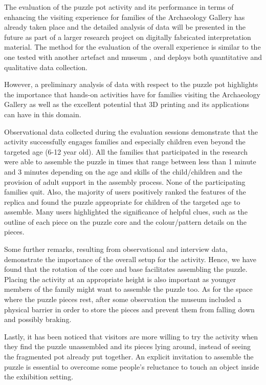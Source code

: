 \documentclass[acmlarge,screen,dvipsnames]{acmart}
\begin{document}
\greenBegin
The evaluation of the puzzle pot activity 
and its performance in terms of enhancing the visiting experience for families 
of the Archaeology Gallery has already taken place and the detailed analysis 
of data will be presented in the future as part of a larger research project 
on digitally fabricated interpretation material. The method for the evaluation 
of the overall experience is similar to the one tested with another artefact 
and museum \cite{Samaroudi2017},\cite{10.1007/978-3-030-23089-0_7} and deploys both 
quantitative and qualitative data collection.


However, a preliminary analysis of data with respect to the puzzle 
pot highlights the importance that hands-on activities have for families 
visiting the Archaeology Gallery as well as the excellent potential 
that 3D printing and its applications can have in this domain. 

Observational data collected during the evaluation sessions
demonstrate that the activity successfully engages families and
especially children even beyond the targeted age (6-12 year old). All
the families that participated in the research were able to assemble
the puzzle in times that range between less than 1 minute and 3 minutes
depending on the age and skills of the child/children and the
provision of adult support in the assembly process. None of the
participating families quit. Also, the majority of users positively
ranked the features of the replica and found the puzzle appropriate
for children of the targeted age to assemble. Many users highlighted
the significance of helpful clues, such as the outline of each piece
on the puzzle core and the colour/pattern details on the pieces. 

Some further remarks, resulting from observational and interview data,
demonstrate the importance of the overall setup for the activity. 
Hence, we have found that the rotation of the core and base
facilitates assembling the puzzle. Placing
the activity at an appropriate height is also important as younger
members of the family might want to assemble the puzzle too.  
As for the space where the puzzle pieces rest, after some observation
the museum included a physical barrier in order to store the
pieces and prevent them from falling down and possibly braking. 


Lastly, it has been noticed that
visitors are more willing to try the activity when they find the
puzzle unassembled and its pieces lying around, instead of seeing the
fragmented pot already put together. An explicit invitation to
assemble the puzzle is essential to overcome some people’s reluctance
to touch an object inside the exhibition setting. 
\end{document}
